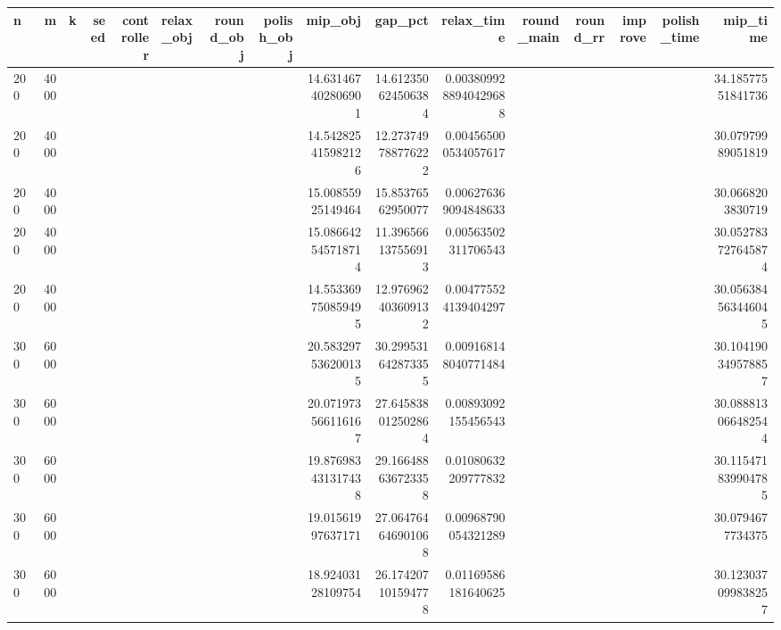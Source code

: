 \begin{tabular}{lrrrrlrrrrrrrrrr}
\hline
n & m & k & seed & controller & relax_obj & round_obj & polish_obj & mip_obj & gap_pct & relax_time & round_main & round_rr & improve & polish_time & mip_time \\ \hline
200 & 4000 &  &  &  &  &  &  & 14.631467402806901 & 14.612350624506384 & 0.0038099288940429688 &  &  &  &  & 34.18577551841736 \\
200 & 4000 &  &  &  &  &  &  & 14.542825415982126 & 12.273749788776222 & 0.004565000534057617 &  &  &  &  & 30.07979989051819 \\
200 & 4000 &  &  &  &  &  &  & 15.00855925149464 & 15.85376562950077 & 0.006276369094848633 &  &  &  &  & 30.0668203830719 \\
200 & 4000 &  &  &  &  &  &  & 15.086642545718714 & 11.396566137556913 & 0.00563502311706543 &  &  &  &  & 30.052783727645874 \\
200 & 4000 &  &  &  &  &  &  & 14.553369750859495 & 12.976962403609132 & 0.004775524139404297 &  &  &  &  & 30.056384563446045 \\
300 & 6000 &  &  &  &  &  &  & 20.583297536200135 & 30.299531642873355 & 0.009168148040771484 &  &  &  &  & 30.104190349578857 \\
300 & 6000 &  &  &  &  &  &  & 20.071973566116167 & 27.645838012502864 & 0.00893092155456543 &  &  &  &  & 30.088813066482544 \\
300 & 6000 &  &  &  &  &  &  & 19.876983431317438 & 29.166488636723358 & 0.01080632209777832 &  &  &  &  & 30.115471839904785 \\
300 & 6000 &  &  &  &  &  &  & 19.01561997637171 & 27.064764646901068 & 0.00968790054321289 &  &  &  &  & 30.0794677734375 \\
300 & 6000 &  &  &  &  &  &  & 18.92403128109754 & 26.174207101594778 & 0.01169586181640625 &  &  &  &  & 30.123037099838257 \\
\hline
\end{tabular}
